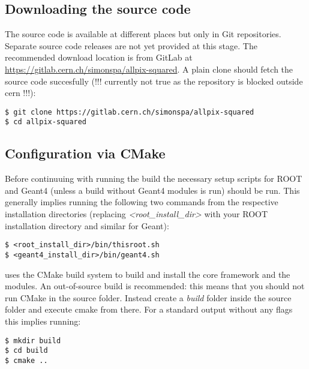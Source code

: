 \subsection{Downloading the source code}
The source code is available at different places but only in Git repositories. Separate source code releases are not yet provided at this stage. The recommended download location is from GitLab at \url{https://gitlab.cern.ch/simonspa/allpix-squared}. A plain clone should fetch the source code succesfully (!!! currently not true as the repository is blocked outside cern !!!):

\begin{verbatim}
$ git clone https://gitlab.cern.ch/simonspa/allpix-squared
$ cd allpix-squared
\end{verbatim}

\subsection{Configuration via CMake}
\label{sec:cmake_config}
Before continuuing with running the build the necessary setup scripts for ROOT and Geant4 (unless a build without Geant4 modules is run) should be run. This generally implies running the following two commands from the respective installation directories (replacing \textit{\textless root\_install\_dir\textgreater} with your ROOT installation directory and similar for Geant):
\begin{verbatim}
$ <root_install_dir>/bin/thisroot.sh
$ <geant4_install_dir>/bin/geant4.sh
\end{verbatim}

\apsq uses the CMake build system to build and install the core framework and the modules. An out-of-source build is recommended: this means that you should not run CMake in the source folder. Instead create a \textit{build} folder inside the source folder and execute cmake from there. For a standard output without any flags this implies running:

\begin{verbatim}
$ mkdir build
$ cd build
$ cmake ..
\end{verbatim}

